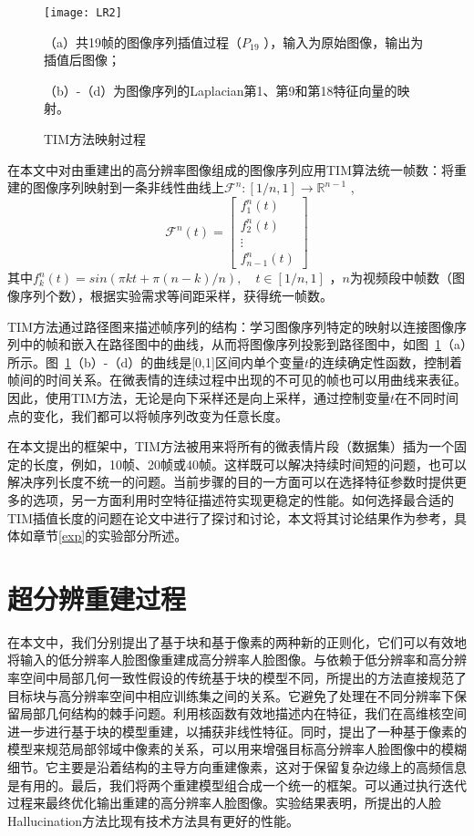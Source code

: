 \begin{figure}[!htbp]
    \centering
    \texttt{[image: LR2]}
    \begin{spacing}{1.0}
    \caption{TIM方法映射过程}
    \label{fig14}
    \centerline{\footnotesize \textmd{（a）共19帧的图像序列插值过程（$P_{19}$ ），输入为原始图像，输出为插值后图像；}}
    \centerline{\footnotesize \textmd{（b）-（d）为图像序列的Laplacian第1、第9和第18特征向量的映射。}}
    \end{spacing}
\end{figure}

在本文中对由重建出的高分辨率图像组成的图像序列应用TIM算法统一帧数：将重建的图像序列映射到一条非线性曲线上$\mathcal{F}^{n}:\left [ 1/n,1 \right ]\rightarrow \mathbb{R}^{n-1}$ ,
\begin{equation}
    \label{eq5}
    \mathcal{F}^{n}(t)=\begin{bmatrix}f_{1}^{n}(t)\\ f_{2}^{n}(t)\\ \vdots \\ f_{n-1}^{n}(t)\end{bmatrix}
\end{equation}
其中$f_{k}^{n}(t)=sin(\pi kt+\pi (n-k)/n),\quad t\in \left [ 1/n,1 \right ]$ ，$n$为视频段中帧数（图像序列个数），根据实验需求等间距采样，获得统一帧数。

TIM方法通过路径图来描述帧序列的结构：学习图像序列特定的映射以连接图像序列中的帧和嵌入在路径图中的曲线，从而将图像序列投影到路径图中，如图~\ref{fig14}（a）所示。图~\ref{fig14}（b）-（d）的曲线是[0,1]区间内单个变量$t$的连续确定性函数，控制着帧间的时间关系。在微表情的连续过程中出现的不可见的帧也可以用曲线来表征。因此，使用TIM方法，无论是向下采样还是向上采样，通过控制变量$t$在不同时间点的变化，我们都可以将帧序列改变为任意长度。

在本文提出的框架中，TIM方法被用来将所有的微表情片段（数据集）插为一个固定的长度，例如，10帧、20帧或40帧。这样既可以解决持续时间短的问题，也可以解决序列长度不统一的问题。当前步骤的目的一方面可以在选择特征参数时提供更多的选项，另一方面利用时空特征描述符实现更稳定的性能。如何选择最合适的TIM插值长度的问题在论文中进行了探讨和讨论，本文将其讨论结果作为参考，具体如章节\ref{exp}的实验部分所述。

\section{超分辨重建过程}

在本文中，我们分别提出了基于块和基于像素的两种新的正则化，它们可以有效地将输入的低分辨率人脸图像重建成高分辨率人脸图像。与依赖于低分辨率和高分辨率空间中局部几何一致性假设的传统基于块的模型不同，所提出的方法直接规范了目标块与高分辨率空间中相应训练集之间的关系。它避免了处理在不同分辨率下保留局部几何结构的棘手问题。利用核函数有效地描述内在特征，我们在高维核空间进一步进行基于块的模型重建，以捕获非线性特征。同时，提出了一种基于像素的模型来规范局部邻域中像素的关系，可以用来增强目标高分辨率人脸图像中的模糊细节。它主要是沿着结构的主导方向重建像素，这对于保留复杂边缘上的高频信息是有用的。最后，我们将两个重建模型组合成一个统一的框架。可以通过执行迭代过程来最终优化输出重建的高分辨率人脸图像。实验结果表明，所提出的人脸Hallucination方法比现有技术方法具有更好的性能。

